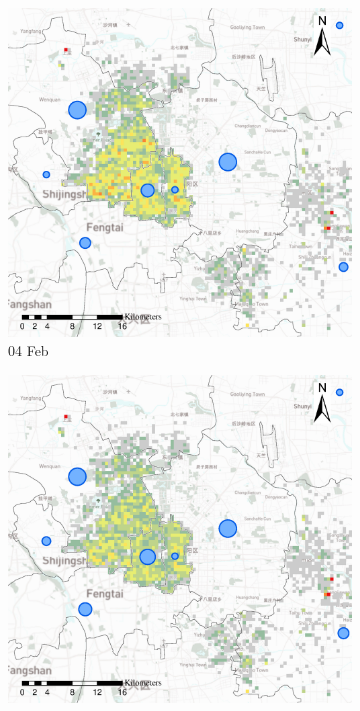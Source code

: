 \documentclass[preprints,ijgi,submit,moreauthors]{Definitions/mdpi}
\begin{document}
\begin{figure}[ht]
    \vspace{6pt}
    \begin{subfigure}{.3\textwidth}
        \includegraphics[width=\textwidth]{Figures/Relation_with_confrimed_cases/NewDistrictSSBD2020_02_04.eps}
        \caption{04 Feb}
    \end{subfigure}
    \begin{subfigure}{.3\textwidth}
        \includegraphics[width=\textwidth]{Figures/Relation_with_confrimed_cases/NewDistrictSSBD2020_02_08.eps}

\end{subfigure}
\end{figure}
\end{document}
